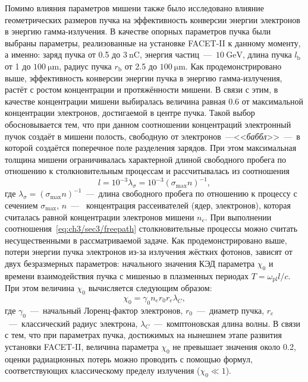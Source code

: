 Помимо влияния параметров мишени также было исследовано влияние геометрических размеров пучка на эффективность конверсии энергии электронов в энергию гамма-излучения.
В качестве опорных параметров пучка были выбраны параметры, реализованные на установке FACET-II к данному моменту, а именно: заряд пучка от 0.5 до $\SI{3}{\nano\coulomb}$, энергия частиц~---~$\SI{10}{\giga\electronvolt}$, длина пучка $l_\mathrm{b}$ от 1 до $\SI{100}{\um}$, радиус пучка $r_\mathrm{b}$ от 2.5 до $\SI{100}{\um}$.
Как продемонстрировано выше, эффективность конверсии энергии пучка в энергию гамма-излучения, растёт с ростом концентрации и протяжённости мишени.
В связи с этим, в качестве концентрации мишени выбиралась величина равная 0.6 от максимальной концентрации электронов, достигаемой в центре пучка.
Такой выбор обосновывается тем, что при данном соотношении концентраций электронный пучок создаёт в мишени полость, свободную от электронов~---<<\textit{баббл}>>~---~в которой создаётся поперечное поле разделения зарядов.
При этом максимальная толщина мишени ограничивалась характерной длиной свободного пробега по отношению к столкновительным процессам и рассчитывалась из соотношения
\begin{equation}
    l = 10^{-3} \lambda_\sigma = 10^{-3} \left( \sigma_\mathrm{max} n \right)^{-1},
\end{equation}
где $\lambda_\sigma = ( \sigma_\mathrm{max} n )^{-1}$~---~длина свободного пробега по отношению к процессу с сечением $\sigma_\mathrm{max}$, $n$~---~ концентрация рассеивателей (ядер, электронов), которая считалась равной концентрации электронов мишени $n_e$.
При выполнении соотношения~\eqref{eq:ch3/sec3/freepath} столкновительные процессы можно считать несущественными в рассматриваемой задаче. 
Как продемонстрировано выше, потери энергии пучка электронов из-за излучения жёстких фотонов, зависят от двух безразмерных параметров: начального значения КЭД параметра $\chi_0$ и времени взаимодействия пучка с мишенью в плазменных периодах $T = \omega_\mathrm{pl} l / c$.
При этом величина $\chi_0$ вычисляется следующим образом:
\begin{equation}
    \label{eq:ch3/sec3/chi}
    \chi_0 = \gamma_0 n_e r_0 r_e \lambda_C, 
\end{equation}
где $\gamma_0$~---~начальный Лоренц-фактор электронов, $r_0$~---~диаметр пучка, {$r_e$~---~классический радиус электрона}, $\lambda_C$~---~комптоновская длина волны.
В связи с тем, что при параметрах пучка, достижимых на нынешнем этапе развития установки FACET-II, величина параметра $\chi_0$ не превышает значения около 0.2, оценки радиационных потерь можно проводить с помощью формул, соответствующих классическому пределу излучения ($\chi_0 \ll 1$).
